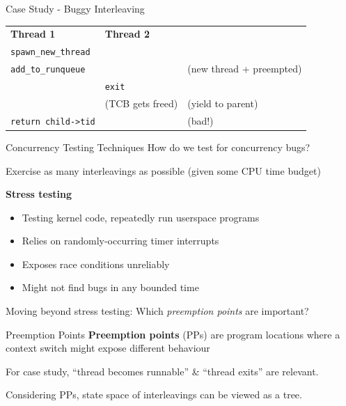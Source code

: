 \documentclass[xcolor=dvipsnames]{beamer}
\begin{document}
\begin{frame}{Case Study - Buggy Interleaving}
	\begin{tabular}{|l|l|l}
		\cline{1-2}
		\cellcolor{thread1} {\bf Thread 1} & \cellcolor{thread2} {\bf Thread 2} & \\
		\cline{1-2}
		\texttt{spawn\_new\_thread} && \\
		\cline{1-2}
		\texttt{add\_to\_runqueue} && (new thread + preempted) \\
		\cline{1-2}
		& \texttt{exit} & \\
		\cline{1-2}
		& (TCB gets freed) & (yield to parent) \\
		\cline{1-2}
		\texttt{return child->tid} && (bad!) \\
		\cline{1-2}
	\end{tabular}
\end{frame}


\begin{frame}{Concurrency Testing Techniques}
	How do we test for concurrency bugs?
	\linegap

	Exercise as many interleavings as possible (given some CPU time budget)
	\linegap

	\textbf{Stress testing}
	\begin{itemize}
		\item Testing kernel code, repeatedly run userspace programs
		\item Relies on randomly-occurring timer interrupts %
		\item Exposes race conditions unreliably
		\item Might not find bugs in any bounded time
	\end{itemize}
	\pause
	\linegap

	Moving beyond stress testing: Which {\em preemption points} are important?
\end{frame}

\begin{frame}{Preemption Points}
	\textbf{Preemption points} (PPs) are program locations where a context switch might expose different behaviour
	\linegap

	For case study, ``thread becomes runnable'' \& ``thread exits'' are relevant.
	\linegap

	Considering PPs, state space of interleavings can be viewed as a tree.
\end{frame}
\end{document}
